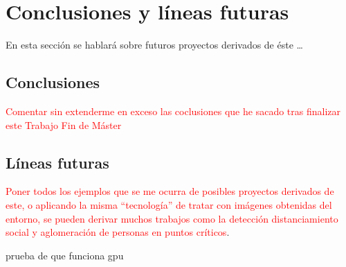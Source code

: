 
\chapter{Conclusiones y líneas futuras}
\label{cha:concl-lineas-futuras}

En esta sección se hablará sobre futuros proyectos derivados de éste \ldots

\section{Conclusiones}
\label{sec:conclusiones-finales}

\textcolor{red}{Comentar sin extenderme en exceso las coclusiones que he sacado tras finalizar este Trabajo Fin de Máster}

\section{Líneas futuras}
\label{sec:lineas-futuras}

\textcolor{red}{Poner todos los ejemplos que se me ocurra de posibles proyectos derivados de este, o aplicando la misma ``tecnología'' de tratar con imágenes obtenidas del entorno, se pueden derivar muchos trabajos como la detección distanciamiento social y aglomeración de personas en puntos críticos}.

prueba de que funciona \acrshort{gpu}